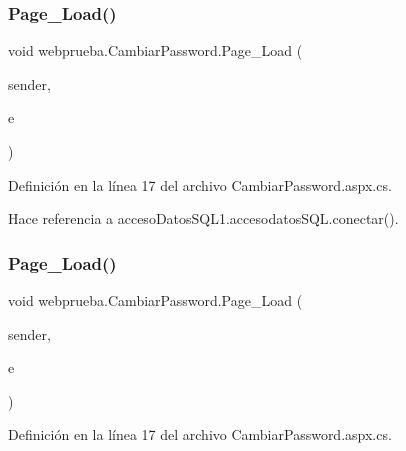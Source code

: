 \subsubsection{\texorpdfstring{Page\_Load()}{Page\_Load()}\hspace{0.1cm}{\footnotesize\ttfamily [1/2]}}
{\footnotesize\ttfamily void webprueba.\+Cambiar\+Password.\+Page\+\_\+\+Load (\begin{DoxyParamCaption}\item[{object}]{sender,  }\item[{Event\+Args}]{e }\end{DoxyParamCaption})\hspace{0.3cm}{\ttfamily [protected]}}



Definición en la línea 17 del archivo Cambiar\+Password.\+aspx.\+cs.


\begin{DoxyCode}{0}

\end{DoxyCode}


Hace referencia a acceso\+Datos\+S\+Q\+L1.\+accesodatos\+S\+Q\+L.\+conectar().

\mbox{\label{classwebprueba_1_1_cambiar_password_a138bf721660479664b0de2f827ce5333}} 
\subsubsection{\texorpdfstring{Page\_Load()}{Page\_Load()}\hspace{0.1cm}{\footnotesize\ttfamily [2/2]}}
{\footnotesize\ttfamily void webprueba.\+Cambiar\+Password.\+Page\+\_\+\+Load (\begin{DoxyParamCaption}\item[{object}]{sender,  }\item[{Event\+Args}]{e }\end{DoxyParamCaption})\hspace{0.3cm}{\ttfamily [protected]}}



Definición en la línea 17 del archivo Cambiar\+Password.\+aspx.\+cs.


